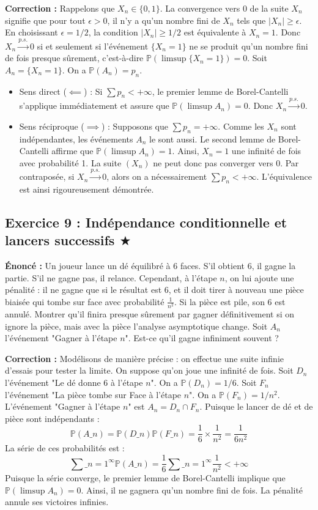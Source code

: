 \documentclass[11pt,a4paper]{article}
\begin{document}
\textbf{Correction :}
Rappelons que $X_n \in \{0, 1\}$.
La convergence vers 0 de la suite $X_n$ signifie que pour tout $\epsilon > 0$, il n'y a qu'un nombre fini de $X_n$ tels que $|X_n| \ge \epsilon$.
En choisissant $\epsilon = 1/2$, la condition $|X_n| \ge 1/2$ est équivalente à $X_n = 1$.
Donc $X_n \xrightarrow{p.s.} 0$ si et seulement si l'événement $\{X_n = 1\}$ ne se produit qu'un nombre fini de fois presque sûrement, c'est-à-dire $\mathbb{P}(\limsup \{X_n = 1\}) = 0$.
Soit $A_n = \{X_n = 1\}$. On a $\mathbb{P}(A_n) = p_n$.
\begin{itemize}
\item Sens direct ($\impliedby$) : Si $\sum p_n < +\infty$, le premier lemme de Borel-Cantelli s'applique immédiatement et assure que $\mathbb{P}(\limsup A_n) = 0$. Donc $X_n \xrightarrow{p.s.} 0$.
\item Sens réciproque ($\implies$) : Supposons que $\sum p_n = +\infty$. Comme les $X_n$ sont indépendantes, les événements $A_n$ le sont aussi. Le second lemme de Borel-Cantelli affirme que $\mathbb{P}(\limsup A_n) = 1$. Ainsi, $X_n = 1$ une infinité de fois avec probabilité 1. La suite $(X_n)$ ne peut donc pas converger vers 0. Par contraposée, si $X_n \xrightarrow{p.s.} 0$, alors on a nécessairement $\sum p_n < +\infty$.
L'équivalence est ainsi rigoureusement démontrée.
\end{itemize}


\subsection*{Exercice 9 : Indépendance conditionnelle et lancers successifs \quad $\bigstar$}





\textbf{Énoncé :}
Un joueur lance un dé équilibré à 6 faces. S'il obtient 6, il gagne la partie. S'il ne gagne pas, il relance. Cependant, à l'étape $n$, on lui ajoute une pénalité : il ne gagne que si le résultat est 6, et il doit tirer à nouveau une pièce biaisée qui tombe sur face avec probabilité $\frac{1}{n^2}$. Si la pièce est pile, son 6 est annulé.
Montrer qu'il finira presque sûrement par gagner définitivement si on ignore la pièce, mais avec la pièce l'analyse asymptotique change. Soit $A_n$ l'événement "Gagner à l'étape $n$". Est-ce qu'il gagne infiniment souvent ?

\textbf{Correction :}
Modélisons de manière précise : on effectue une suite infinie d'essais pour tester la limite. On suppose qu'on joue une infinité de fois.
Soit $D_n$ l'événement "Le dé donne 6 à l'étape $n$". On a $\mathbb{P}(D_n) = 1/6$.
Soit $F_n$ l'événement "La pièce tombe sur Face à l'étape $n$". On a $\mathbb{P}(F_n) = 1/n^2$.
L'événement "Gagner à l'étape $n$" est $A_n = D_n \cap F_n$.
Puisque le lancer de dé et de pièce sont indépendants :
$$ \mathbb{P}(A\_n) = \mathbb{P}(D\_n) \mathbb{P}(F\_n) = \frac{1}{6} \times \frac{1}{n^2} = \frac{1}{6n^2} $$
La série de ces probabilités est :
$$ \sum\_{n=1}^\infty \mathbb{P}(A\_n) = \frac{1}{6} \sum\_{n=1}^\infty \frac{1}{n^2} < +\infty $$
Puisque la série converge, le premier lemme de Borel-Cantelli implique que $\mathbb{P}(\limsup A_n) = 0$.
Ainsi, il ne gagnera qu'un nombre fini de fois. La pénalité annule ses victoires infinies.
\end{document}
